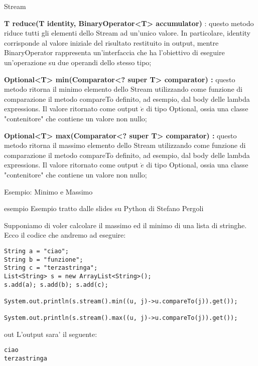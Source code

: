 \documentclass{beamer}
\begin{document}
\begin{frame}{Stream}
\fontsize{9pt}{7.2}\selectfont
\begin{flushleft}
\textbf{T reduce(T identity, BinaryOperator<T> accumulator)} : questo metodo riduce tutti gli elementi dello Stream ad un'unico valore. In particolare, identity corrisponde al valore iniziale del risultato restituito in output, mentre BinaryOperator rappresenta un'interfaccia che ha l'obiettivo di eseguire un'operazione su due operandi dello stesso tipo;
\end{flushleft}
\begin{flushleft}
\textbf{Optional<T> min(Comparator<? super T> comparator) :}
questo metodo ritorna il minimo elemento dello Stream utilizzando come funzione di comparazione il metodo compareTo definito, ad esempio, dal body delle lambda expressions. Il valore ritornato come output $\grave{e}$ di tipo Optional, ossia una classe "contenitore" che contiene un valore non nullo;
\end{flushleft}
\begin{flushleft}
\textbf{Optional<T> max(Comparator<? super T> comparator) :}
questo metodo ritorna il massimo elemento dello Stream utilizzando come funzione di comparazione il metodo compareTo definito, ad esempio, dal body delle lambda expressions. Il valore ritornato come output $\grave{e}$ di tipo Optional, ossia una classe "contenitore" che contiene un valore non nullo;
\end{flushleft}
\end{frame}

\begin{frame}[fragile]{Esempio: Minimo e Massimo}
\fontsize{8pt}{7.2}\selectfont
{}
\begin{beamercolorbox}{esempio}
Esempio tratto dalle slides su Python di Stefano Pergoli
\end{beamercolorbox}
\fontsize{11pt}{7.2}\selectfont
\begin{flushleft}
Supponiamo di voler calcolare il massimo ed il minimo di una lista di stringhe. Ecco il codice che andremo ad eseguire:
\end{flushleft}
\begin{lstlisting}
String a = "ciao";
String b = "funzione";
String c = "terzastringa";
List<String> s = new ArrayList<String>();	
s.add(a); s.add(b); s.add(c);
		
System.out.println(s.stream().min((u, j)->u.compareTo(j)).get());

System.out.println(s.stream().max((u, j)->u.compareTo(j)).get());
\end{lstlisting}
\begin{beamercolorbox}{out}
L'output sara' il seguente:
\end{beamercolorbox}
\begin{lstlisting}
ciao
terzastringa
\end{lstlisting}
\end{frame}
\end{document}
